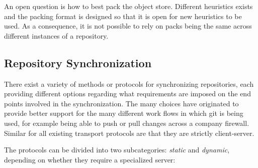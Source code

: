 An open question is how to best pack the object store. Different
heuristics exists and the packing format is designed so that it is
open for new heuristics to be used. As a consequence, it is not
possible to rely on packs being the same across different instances of
a repository.

\subsection{Repository Synchronization}
\label{sec:repo-sync}

There exist a variety of methods or protocols for synchronizing
repositories, each providing different options regarding what
requirements are imposed on the end points involved in the
synchronization. The many choices have originated to provide better
support for the many different work flows in which git is being used,
for example being able to push or pull changes across a company firewall.
Similar for all existing transport protocols are that they are
strictly client-server.

The protocols can be divided into two subcategories: \emph{static} and
\emph{dynamic}, depending on whether they require a
specialized server:


